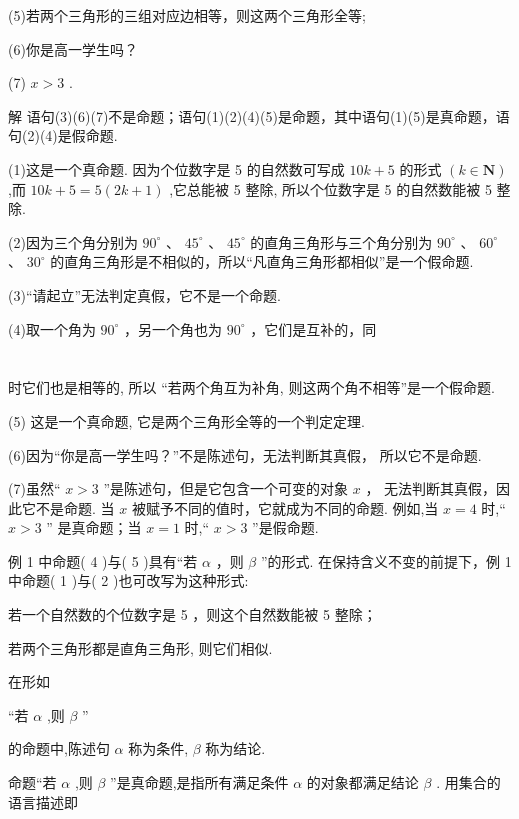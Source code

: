 \documentclass[10pt]{article}
\begin{document}
(5)若两个三角形的三组对应边相等，则这两个三角形全等;

(6)你是高一学生吗？

(7) \(x > 3\) .

解 语句(3)(6)(7)不是命题；语句(1)(2)(4)(5)是命题，其中语句(1)(5)是真命题，语句(2)(4)是假命题.

(1)这是一个真命题. 因为个位数字是 5 的自然数可写成 \({10k} + 5\) 的形式 \(\left( {k \in  \mathbf{N}}\right)\) ,而 \({10k} + 5 = 5\left( {{2k} + 1}\right)\) ,它总能被 5 整除, 所以个位数字是 5 的自然数能被 5 整除.

(2)因为三个角分别为 \({90}^{ \circ  }\) 、 \({45}^{ \circ  }\) 、 \({45}^{ \circ  }\) 的直角三角形与三个角分别为 \({90}^{ \circ  }\) 、 \({60}^{ \circ  }\) 、 \({30}^{ \circ  }\) 的直角三角形是不相似的，所以“凡直角三角形都相似”是一个假命题.

(3)“请起立”无法判定真假，它不是一个命题.

(4)取一个角为 \({90}^{ \circ  }\) ，另一个角也为 \({90}^{ \circ  }\) ，它们是互补的，同

\section*{}

时它们也是相等的, 所以 “若两个角互为补角, 则这两个角不相等”是一个假命题.

(5) 这是一个真命题, 它是两个三角形全等的一个判定定理.

(6)因为“你是高一学生吗？”不是陈述句，无法判断其真假， 所以它不是命题.

(7)虽然“ \(x > 3\) ”是陈述句，但是它包含一个可变的对象 \(x\) ， 无法判断其真假，因此它不是命题. 当 \(x\) 被赋予不同的值时，它就成为不同的命题. 例如,当 \(x = 4\) 时,“ \(x > 3\) ” 是真命题；当 \(x = 1\) 时,“ \(x > 3\) ”是假命题.

例 1 中命题( 4 )与( 5 )具有“若 \(\alpha\) ，则 \(\beta\) ”的形式. 在保持含义不变的前提下，例 1 中命题( 1 )与( 2 )也可改写为这种形式:

若一个自然数的个位数字是 5 ，则这个自然数能被 5 整除；

若两个三角形都是直角三角形, 则它们相似.

在形如

“若 \(\alpha\) ,则 \(\beta\) ”

的命题中,陈述句 \(\alpha\) 称为条件, \(\beta\) 称为结论.

命题“若 \(\alpha\) ,则 \(\beta\) ”是真命题,是指所有满足条件 \(\alpha\) 的对象都满足结论 \(\beta\) . 用集合的语言描述即
\end{document}
